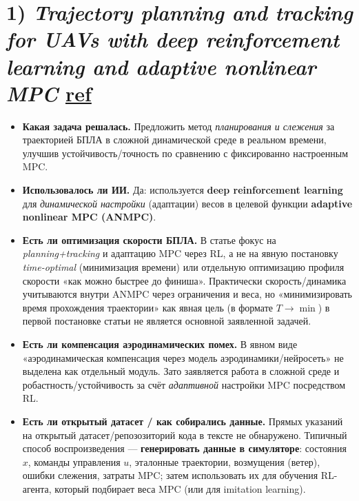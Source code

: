 
\section*{1) \textit{Trajectory planning and tracking for UAVs with deep reinforcement learning and adaptive nonlinear MPC} \href{https://www.sciencedirect.com/science/article/pii/S0957417425042642}{ref}}
\begin{itemize}
  \item \textbf{Какая задача решалась.}
  Предложить метод \emph{планирования и слежения} за траекторией БПЛА в сложной динамической среде в реальном времени, улучшив устойчивость/точность по сравнению с фиксированно настроенным MPC.

  \item \textbf{Использовалось ли ИИ.}
  Да: используется \textbf{deep reinforcement learning} для \emph{динамической настройки} (адаптации) весов в целевой функции \textbf{adaptive nonlinear MPC (ANMPC)}.

  \item \textbf{Есть ли оптимизация скорости БПЛА.}
  В статье фокус на \emph{planning+tracking} и адаптацию MPC через RL, а не на явную постановку \emph{time-optimal} (минимизация времени) или отдельную оптимизацию профиля скорости «как можно быстрее до финиша».
  Практически скорость/динамика учитываются внутри ANMPC через ограничения и веса, но «минимизировать время прохождения траектории» как явная цель (в формате $T\to\min$) в первой постановке статьи не является основной заявленной задачей.

  \item \textbf{Есть ли компенсация аэродинамических помех.}
  В явном виде «аэродинамическая компенсация через модель аэродинамики/нейросеть» не выделена как отдельный модуль.
  Зато заявляется работа в сложной среде и робастность/устойчивость за счёт \emph{адаптивной} настройки MPC посредством RL.

  \item \textbf{Есть ли открытый датасет / как собирались данные.}
  Прямых указаний на открытый датасет/репозозиторий кода в тексте не обнаружено.
  Типичный способ воспроизведения — \textbf{генерировать данные в симуляторе}:
  состояния $x$, команды управления $u$, эталонные траектории, возмущения (ветер), ошибки слежения, затраты MPC; затем использовать их для обучения RL-агента, который подбирает веса MPC (или для imitation learning).
\end{itemize}

